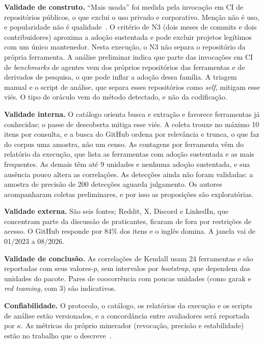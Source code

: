 \documentclass[sigconf]{acmart}
\begin{document}
\textbf{Validade de construto.} ``Mais usada'' foi medida pela invocação em CI de repositórios públicos, o que exclui o uso privado e corporativo. Menção não é uso, e popularidade não é qualidade~\cite{borges2018star}. O critério de N3 (dois meses de commits e dois contribuidores) aproxima a adoção sustentada e pode excluir projetos legítimos com um único mantenedor. Nesta execução, o N3 não separa o repositório da própria ferramenta. A análise preliminar indica que parte das invocações em CI de \textit{benchmarks} de agentes vem dos próprios repositórios das ferramentas e de derivados de pesquisa, o que pode inflar a adoção dessa família. A triagem manual e o script de análise, que separa esses repositórios como \textit{self}, mitigam esse viés. O tipo de oráculo vem do método detectado, e não da codificação.

\textbf{Validade interna.} O catálogo orienta busca e extração e favorece ferramentas já conhecidas; o passe de descoberta mitiga esse viés. A coleta trouxe no máximo 10 itens por consulta, e a busca do GitHub ordena por relevância e trunca, o que faz do corpus uma amostra, não um censo. As contagens por ferramenta vêm do relatório da execução, que lista as ferramentas com adoção sustentada e as mais frequentes. As demais têm até 9 unidades e nenhuma adoção sustentada, e sua ausência pouco altera as correlações. As detecções ainda não foram validadas: a amostra de precisão de 200 detecções aguarda julgamento. Os autores acompanharam coletas preliminares, e por isso as proposições são exploratórias.

\textbf{Validade externa.} São seis fontes; Reddit, X, Discord e LinkedIn, que concentram parte da discussão de praticantes, ficaram de fora por restrições de acesso. O GitHub responde por 84\% dos itens e o inglês domina. A janela vai de 01/2023 a 08/2026.

\textbf{Validade de conclusão.} As correlações de Kendall usam 24 ferramentas e são reportadas com seus valores-$p$, sem intervalos por \textit{bootstrap}, que dependem das unidades do pacote. Pares de coocorrência com poucas unidades (como garak e \textit{red teaming}, com 3) são indicativos.

\textbf{Confiabilidade.} O protocolo, o catálogo, os relatórios da execução e os scripts de análise estão versionados, e a concordância entre avaliadores será reportada por $\kappa$. As métricas do próprio minerador (revocação, precisão e estabilidade) estão no trabalho que o descreve~\cite{msrkit2027}.

\end{document}
